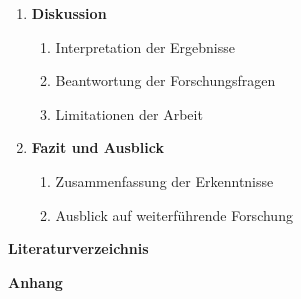 \begin{enumerate}[leftmargin=*, label=\arabic*, font=\bfseries, noitemsep]
\begin{enumerate}[label=\theenumi.\arabic*, noitemsep]
	      \end{enumerate}
	\item\textbf{Diskussion}
	      \begin{enumerate}[label=\theenumi.\arabic*, noitemsep]
		      \item Interpretation der Ergebnisse
		      \item Beantwortung der Forschungsfragen
		      \item Limitationen der Arbeit
	      \end{enumerate}
	\item\textbf{Fazit und Ausblick}
	      \begin{enumerate}[label=\theenumi.\arabic*, noitemsep]
		      \item Zusammenfassung der Erkenntnisse
		      \item Ausblick auf weiterführende Forschung
	      \end{enumerate}
\end{enumerate}
\noindent\textbf{Literaturverzeichnis}
\par\noindent\textbf{Anhang}
